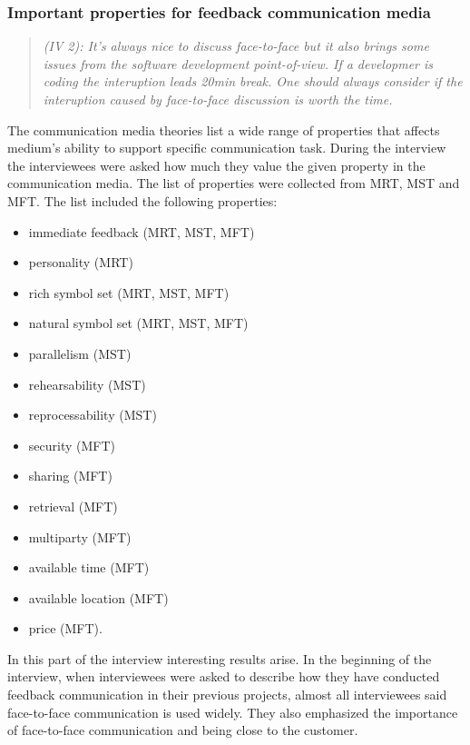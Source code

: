 \documentclass[english,12pt,a4paper,pdftex]{article}
\newcommand{\q}[2]{
\begin{quote}
\emph{(IV #1): #2}
\end{quote}}
\begin{document}
\subsubsection{Important properties for feedback communication media}

\q{2}{It's always nice to discuss face-to-face but it also brings some issues from the software development point-of-view. If a developmer is coding the interuption leads 20min break. One should always consider if the interuption caused by face-to-face discussion is worth the time.}

The communication media theories list a wide range of properties that affects medium's ability to support specific communication task. During the interview the interviewees were asked how much they value the given property in the communication media. The list of properties were collected from \ac{MRT}, \ac{MST} and \ac{MFT}. The list included the following properties:

\begin{itemize}
  \item immediate feedback (\acs{MRT}, \acs{MST}, \acs{MFT})
  \item personality (\acs{MRT})
  \item rich symbol set (\acs{MRT}, \acs{MST}, \acs{MFT})
  \item natural symbol set (\acs{MRT}, \acs{MST}, \acs{MFT})
  \item parallelism (\acs{MST})
  \item rehearsability (\acs{MST})
  \item reprocessability (\acs{MST})
  \item security (\acs{MFT})
  \item sharing (\acs{MFT})
  \item retrieval (\acs{MFT})
  \item multiparty (\acs{MFT})
  \item available time (\acs{MFT})
  \item available location (\acs{MFT})
  \item price (\acs{MFT}). 
\end{itemize}

In this part of the interview interesting results arise. In the beginning of the interview, when interviewees were asked to describe how they have conducted feedback communication in their previous projects, almost all interviewees said face-to-face communication is used widely. They also emphasized the importance of face-to-face communication and being close to the customer. 
\end{document}
